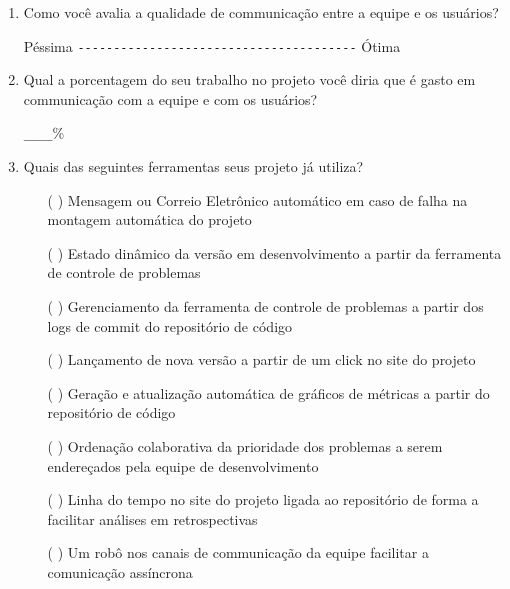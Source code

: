 \begin{enumerate}
\item Como você avalia a qualidade de communicação entre a equipe e
  os usuários?

  Péssima \verb=---------------------------------------= Ótima

\item Qual a porcentagem do seu trabalho no projeto você diria que é
  gasto em communicação com a equipe e com os usuários?

  \verb=____=\%

\item Quais das seguintes ferramentas seus projeto já utiliza?
  \begin{itemize}
  \item[( )] Mensagem ou Correio Eletrônico automático em caso de
    falha na montagem automática do projeto
  \item[( )] Estado dinâmico da versão em desenvolvimento a partir da
    ferramenta de controle de problemas
  \item[( )] Gerenciamento da ferramenta de controle de problemas a
    partir dos logs de commit do repositório de código
  \item[( )] Lançamento de nova versão a partir de um click no site do
    projeto
  \item[( )] Geração e atualização automática de gráficos de métricas
    a partir do repositório de código
  \item[( )] Ordenação colaborativa da prioridade dos problemas a
    serem endereçados pela equipe de desenvolvimento
  \item[( )] Linha do tempo no site do projeto ligada ao repositório
    de forma a facilitar análises em retrospectivas
  \item[( )] Um robô nos canais de communicação da equipe facilitar a
    comunicação assíncrona
  \end{itemize}


\end{enumerate}
